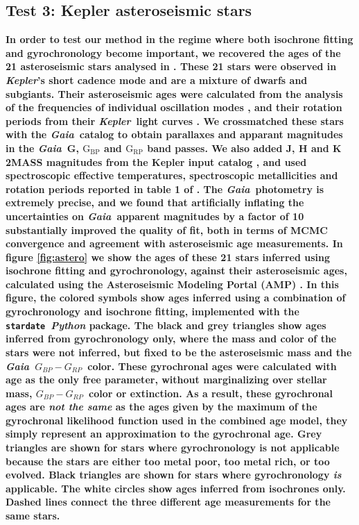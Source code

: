 \documentclass[useAMS, usenatbib, preprint, 12pt]{aastex}
\newcommand{\kepler}{{\it Kepler}}
\newcommand{\Gaia}{{\it Gaia}}
\newcommand{\gaia}{{\it Gaia}}
\newcommand{\sd}{{\tt stardate}}
\newcommand{\gcolor}{$G_{BP} - G_{RP}$}
\newcommand{\racomment}[1]{{\bf #1}}
\begin{document}
\subsection{Test 3: Kepler asteroseismic stars}
\racomment{In order to test our method in the regime where both isochrone
fitting and gyrochronology become important, we recovered the ages of the 21
asteroseismic stars analysed in \citet{vansaders2016}.
These 21 stars were observed in \kepler's short cadence mode and are a mixture
of dwarfs and subgiants.
Their asteroseismic ages were calculated from the analysis of the frequencies
of individual oscillation modes \citep{mathur2012, metcalfe2014,
silvaaguirre2015, ceillier2016}, and their rotation periods from their
\kepler\ light curves \citep{garcia2014}.
We crossmatched these stars with the \Gaia\ catalog to obtain parallaxes and
apparant magnitudes in the \Gaia\ G, $\mathrm{G_{BP}}$ and $\mathrm{G_{RP}}$
band passes.
We also added J, H and K 2MASS magnitudes from the Kepler input catalog
\citep{brown2011},
and used spectroscopic effective temperatures, spectroscopic metallicities and
rotation periods reported in table 1 of \citet{vansaders2016}.
The \gaia\ photometry is extremely precise, and we found that artificially
inflating the uncertainties on \gaia\ apparent magnitudes by a factor of 10
substantially improved the quality of fit, both in terms of MCMC convergence
and agreement with asteroseismic age measurements.
In figure \ref{fig:astero} we show the ages of these 21 stars inferred using
isochrone fitting and gyrochronology, against their asteroseismic ages,
calculated using the Asteroseismic Modeling Portal (AMP) \citep{metcalfe2009,
metcalfe2012, metcalfe2014}.
In this figure, the colored symbols show ages inferred using a combination of
gyrochronology and isochrone fitting, implemented with the \sd\ {\it Python}
package.
The black and grey triangles show ages inferred from gyrochronology only,
where the mass and color of the stars were not inferred, but fixed to be the
asteroseismic mass and the \gaia\ \gcolor\ color.
These gyrochronal ages were calculated with age as the only free parameter,
without marginalizing over stellar mass, \gcolor\ color or extinction.
As a result, these gyrochronal ages are {\it not the same} as the ages given
by the maximum of the gyrochronal likelihood function used in the combined
age model, they simply represent an approximation to the gyrochronal age.
Grey triangles are shown for stars where gyrochronology is not applicable
because the stars are either too metal poor, too metal rich, or too evolved.
Black triangles are shown for stars where gyrochronology {\it is} applicable.
The white circles show ages inferred from isochrones only.
Dashed lines connect the three different age measurements for the same
stars.
}
\end{document}
